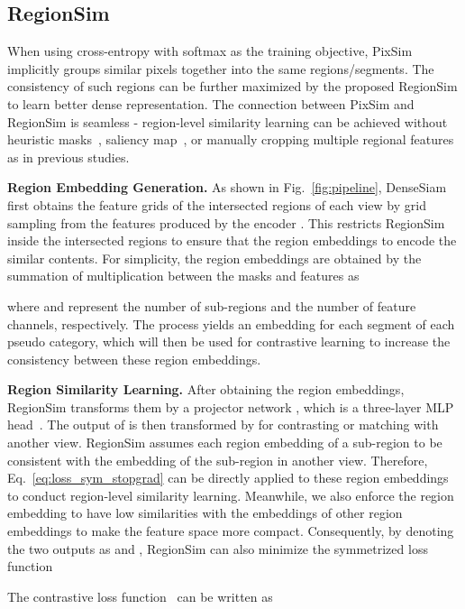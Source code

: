 \documentclass[runningheads]{llncs}
\newcommand{\myparagraph}[1]{{\noindent\bf #1}}
\begin{document}
\subsection{RegionSim}\label{sec:regionsim}

When using cross-entropy with softmax as the training objective,
PixSim implicitly groups similar pixels together into the same regions/segments. The consistency of such regions can be further maximized by the proposed RegionSim to learn better dense representation. 
The connection between PixSim and RegionSim is seamless - region-level similarity learning can be achieved without heuristic masks~\cite{detcon}, saliency map~\cite{CAST}, or manually cropping multiple regional features~\cite{resim, scrl, detco} as in previous studies.  

\myparagraph{Region Embedding Generation.}
As shown in Fig.~\ref{fig:pipeline}, DenseSiam first obtains the feature grids of the intersected regions of each view by grid sampling from the features produced by the encoder .
This restricts RegionSim inside the intersected regions to ensure that the region embeddings to encode the similar contents.
For simplicity, the region embeddings  are obtained by the summation of multiplication between the masks and features as

where  and  represent the number of sub-regions and the number of feature channels, respectively.
The process yields an embedding for each segment of each pseudo category, which will then be used for contrastive learning to increase the consistency between these region embeddings.

\myparagraph{Region Similarity Learning.}
After obtaining the region embeddings, RegionSim transforms them by a projector network , which is a three-layer MLP head~\cite{byol, simclr, simsiam}.
The output of  is then transformed by  for contrasting or matching with another view.
RegionSim assumes each region embedding of a sub-region to be consistent with the embedding of the sub-region in another view.
Therefore, Eq.~\ref{eq:loss_sym_stopgrad} can be directly applied to these region embeddings to conduct region-level similarity learning.
Meanwhile, we also enforce the region embedding to have low similarities with the embeddings of other region embeddings to make the feature space more compact.
Consequently, by denoting the two outputs as  and , RegionSim can also minimize the symmetrized loss function

The contrastive loss function~\cite{infonce}  can be written as
\end{document}
